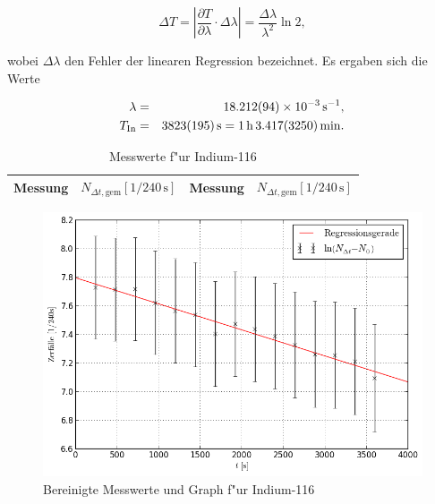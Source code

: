 		\begin{displaymath}
			\Delta T = \left|\frac{\partial T}{\partial \lambda} \cdot \Delta \lambda \right| = \frac{\Delta \lambda}{\lambda^2} \ln{2} ,
		\end{displaymath}

		wobei $\Delta \lambda$ den Fehler der linearen Regression bezeichnet.
		Es ergaben sich die Werte

		\begin{eqnarray*}
			\lambda & = & \SI{18.212 (94)e-3}{\per \second} , \\
			T_\mathrm{In} & = & \SI{3823 (195)}{\second} = \SI{1}{\hour}\,\SI{3.417 (3250)}{\minute} .
		\end{eqnarray*}

		\begin{table}[!h]
			\begin{center}
				\label{tabelle:indium}
				\caption{Messwerte f"ur Indium-116}
				\begin{tabular}{|c|c||c|c|}
					\hline 
					Messung & $N_{\Delta t, \mathrm{gem}}[1 / 240\,\mathrm{s}]$ & Messung & $N_{\Delta t, \mathrm{gem}}[1 / 240\,\mathrm{s}]$\\
					\hline 
					
					\hline 
				\end{tabular}
			\end{center}
		\end{table}

		\begin{figure}[!h]
			\centering
			\includegraphics[width = 15cm]{img/graph_indium_linearisiert.png}
			\caption{Bereinigte Messwerte und Graph f"ur Indium-116}
			\label{fig:indium}
		\end{figure}

